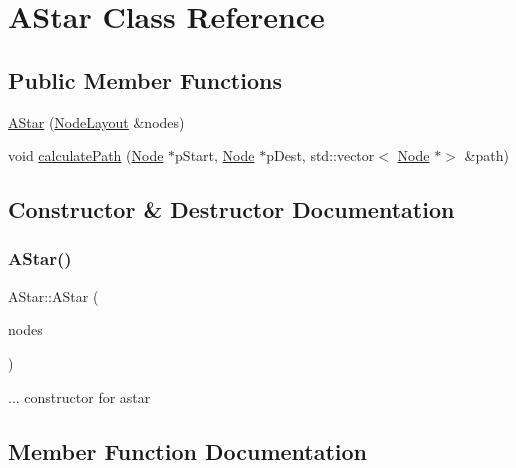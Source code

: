 \hypertarget{class_a_star}{}\section{A\+Star Class Reference}
\label{class_a_star}
\subsection*{Public Member Functions}
\begin{DoxyCompactItemize}
\item 
\mbox{\hyperlink{class_a_star_ab0b03d0729eb5cbf94969544dfaf8802}{A\+Star}} (\mbox{\hyperlink{class_node_layout}{Node\+Layout}} \&nodes)
\item 
void \mbox{\hyperlink{class_a_star_af4b37efdae8b35ee5a07c955a50ed192}{calculate\+Path}} (\mbox{\hyperlink{class_node}{Node}} $\ast$p\+Start, \mbox{\hyperlink{class_node}{Node}} $\ast$p\+Dest, std\+::vector$<$ \mbox{\hyperlink{class_node}{Node}} $\ast$$>$ \&path)
\end{DoxyCompactItemize}


\subsection{Constructor \& Destructor Documentation}
\mbox{\label{class_a_star_ab0b03d0729eb5cbf94969544dfaf8802}} 
\subsubsection{\texorpdfstring{A\+Star()}{AStar()}}
{\footnotesize\ttfamily A\+Star\+::\+A\+Star (\begin{DoxyParamCaption}\item[{\mbox{\hyperlink{class_node_layout}{Node\+Layout}} \&}]{nodes }\end{DoxyParamCaption})}

... constructor for astar

\subsection{Member Function Documentation}
\mbox{\label{class_a_star_af4b37efdae8b35ee5a07c955a50ed192}} 
